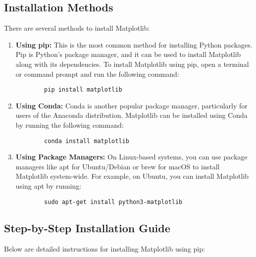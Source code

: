 \subsection{Installation Methods}
There are several methods to install Matplotlib:

\begin{enumerate}[label=\arabic*.]
	\item \textbf{Using pip:} This is the most common method for installing Python packages. Pip is Python's package manager, and it can be used to install Matplotlib along with its dependencies. To install Matplotlib using pip, open a terminal or command prompt and run the following command:
	\begin{lstlisting}
		pip install matplotlib
	\end{lstlisting}
	
	\item \textbf{Using Conda:} Conda is another popular package manager, particularly for users of the Anaconda distribution. Matplotlib can be installed using Conda by running the following command:
	\begin{lstlisting}
		conda install matplotlib
	\end{lstlisting}
	
	\item \textbf{Using Package Managers:} On Linux-based systems, you can use package managers like apt for Ubuntu/Debian or brew for macOS to install Matplotlib system-wide. For example, on Ubuntu, you can install Matplotlib using apt by running:
	\begin{lstlisting}
		sudo apt-get install python3-matplotlib
	\end{lstlisting}
\end{enumerate}

\subsection*{Step-by-Step Installation Guide}
Below are detailed instructions for installing Matplotlib using pip:

